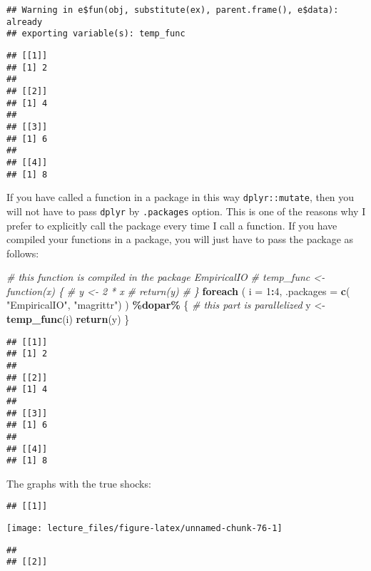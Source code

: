 \documentclass[
]{book}
\newenvironment{Shaded}{\begin{snugshade}}{\end{snugshade}}
\newcommand{\AttributeTok}[1]{\textcolor[rgb]{0.13,0.29,0.53}{#1}}
\newcommand{\CommentTok}[1]{\textcolor[rgb]{0.56,0.35,0.01}{\textit{#1}}}
\newcommand{\DecValTok}[1]{\textcolor[rgb]{0.00,0.00,0.81}{#1}}
\newcommand{\FunctionTok}[1]{\textcolor[rgb]{0.13,0.29,0.53}{\textbf{#1}}}
\newcommand{\NormalTok}[1]{#1}
\newcommand{\OtherTok}[1]{\textcolor[rgb]{0.56,0.35,0.01}{#1}}
\newcommand{\SpecialCharTok}[1]{\textcolor[rgb]{0.81,0.36,0.00}{\textbf{#1}}}
\newcommand{\StringTok}[1]{\textcolor[rgb]{0.31,0.60,0.02}{#1}}
\begin{document}
\begin{verbatim}
## Warning in e$fun(obj, substitute(ex), parent.frame(), e$data): already
## exporting variable(s): temp_func
\end{verbatim}

\begin{verbatim}
## [[1]]
## [1] 2
## 
## [[2]]
## [1] 4
## 
## [[3]]
## [1] 6
## 
## [[4]]
## [1] 8
\end{verbatim}

If you have called a function in a package in this way \texttt{dplyr::mutate}, then you will not have to pass \texttt{dplyr} by \texttt{.packages} option. This is one of the reasons why I prefer to explicitly call the package every time I call a function. If you have compiled your functions in a package, you will just have to pass the package as follows:

\begin{Shaded}
\begin{Highlighting}[]
\CommentTok{\# this function is compiled in the package EmpiricalIO}
\CommentTok{\# temp\_func \textless{}{-} function(x) \{}
\CommentTok{\#   y \textless{}{-} 2 * x}
\CommentTok{\#   return(y)}
\CommentTok{\# \}}
\FunctionTok{foreach}\NormalTok{ (}
  \AttributeTok{i =} \DecValTok{1}\SpecialCharTok{:}\DecValTok{4}\NormalTok{, }
  \AttributeTok{.packages =} \FunctionTok{c}\NormalTok{(}
    \StringTok{"EmpiricalIO"}\NormalTok{,}
    \StringTok{"magrittr"}\NormalTok{)}
\NormalTok{  ) }\SpecialCharTok{\%dopar\%}\NormalTok{ \{}
    \CommentTok{\# this part is parallelized}
\NormalTok{    y }\OtherTok{\textless{}{-}} \FunctionTok{temp\_func}\NormalTok{(i)}
    \FunctionTok{return}\NormalTok{(y)}
\NormalTok{\}}
\end{Highlighting}
\end{Shaded}

\begin{verbatim}
## [[1]]
## [1] 2
## 
## [[2]]
## [1] 4
## 
## [[3]]
## [1] 6
## 
## [[4]]
## [1] 8
\end{verbatim}

The graphs with the true shocks:

\begin{verbatim}
## [[1]]
\end{verbatim}

\begin{center}\texttt{[image: lecture\_files/figure-latex/unnamed-chunk-76-1]} \end{center}

\begin{verbatim}
## 
## [[2]]
\end{verbatim}
\end{document}
